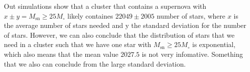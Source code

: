 \documentclass[11pt]{article}
\begin{document}
    Out simulations show that a cluster that contains a supernova with
\(x \pm y= M_{\text{sn}} \geq 25 M_{\circ}\) likely containes
\(22049 \pm 2005\) number of stars, where \(x\) is the average number of
stars needed and y the standard deviation for the number of stars.
However, we can also conclude that the distribution of stars that we
need in a cluster such that we have one star with
\(M_{\text{sn}} \geq 25 M_{\circ}\) is exponential, which also means
that the mean value \(2027.5\) is not very infomative. Something that we
also can conclude from the large standard deviation.


    
    
    
    
\end{document}
